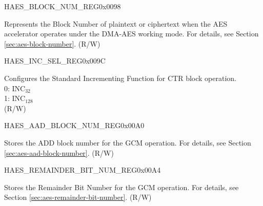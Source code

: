 \begin{register}{H}{AES\_BLOCK\_NUM\_REG}{0x0098}\label{regdesc:AESBLOCKNUMREG}
%
\regnewline%
\begin{regdesc}\begin{reglist}
\item [AES\_BLOCK\_NUM] Represents the Block Number of plaintext or ciphertext when the AES accelerator operates under the DMA-AES working mode. For details, see Section \ref{sec:aes-block-number}. (R/W)
\end{reglist}\end{regdesc}
\end{register}


\begin{register}{H}{AES\_INC\_SEL\_REG}{0x009C}\label{regdesc:AESINCSELREG}
%
%
\regnewline%
\begin{regdesc}\begin{reglist}
\item [AES\_INC\_SEL] Configures the Standard Incrementing Function for CTR block operation. \\
0: INC$_{32}$\\
1: INC$_{128}$\\
(R/W)
\end{reglist}\end{regdesc}
\end{register}


\begin{register}{H}{AES\_AAD\_BLOCK\_NUM\_REG}{0x00A0}\label{regdesc:AESAADBLOCKNUMREG}
%
\regnewline%
\begin{regdesc}\begin{reglist}
\item [AES\_AAD\_BLOCK\_NUM] Stores the ADD block number for the GCM operation. For details, see Section \ref{sec:aes-aad-block-number}. (R/W)
\end{reglist}\end{regdesc}
\end{register}


\begin{register}{H}{AES\_REMAINDER\_BIT\_NUM\_REG}{0x00A4}\label{regdesc:AESREMAINDERBITNUMREG}
%
%
\regnewline%
\begin{regdesc}\begin{reglist}
\item [AES\_REMAINDER\_BIT\_NUM] Stores the Remainder Bit Number for the GCM operation. For details, see Section \ref{sec:aes-remainder-bit-number}. (R/W)
\end{reglist}\end{regdesc}
\end{register}


